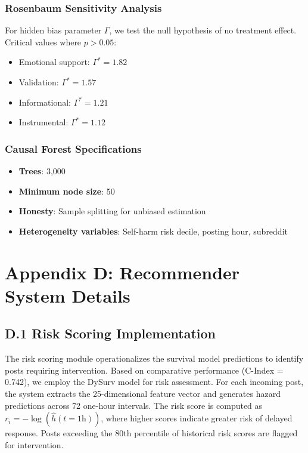 \documentclass[letterpaper]{article} %
\begin{document}
\subsubsection{Rosenbaum Sensitivity Analysis}
For hidden bias parameter $\Gamma$, we test the null hypothesis of no treatment effect. Critical values where $p > 0.05$:
\begin{itemize}
\item Emotional support: $\Gamma^* = 1.82$
\item Validation: $\Gamma^* = 1.57$
\item Informational: $\Gamma^* = 1.21$
\item Instrumental: $\Gamma^* = 1.12$
\end{itemize}

\subsubsection{Causal Forest Specifications}
\begin{itemize}
\item \textbf{Trees}: 3,000
\item \textbf{Minimum node size}: 50
\item \textbf{Honesty}: Sample splitting for unbiased estimation
\item \textbf{Heterogeneity variables}: Self-harm risk decile, posting hour, subreddit
\end{itemize}



\section{Appendix D: Recommender System Details}

\subsection{D.1 Risk Scoring Implementation}

The risk scoring module operationalizes the survival model predictions to identify posts requiring intervention. Based on comparative performance (C-Index = 0.742), we employ the DySurv model for risk assessment. For each incoming post, the system extracts the 25-dimensional feature vector and generates hazard predictions across 72 one-hour intervals. The risk score is computed as $r_i = -\log(\hat{h}(t=1\text{h}))$, where higher scores indicate greater risk of delayed response. Posts exceeding the 80th percentile of historical risk scores are flagged for intervention.
\end{document}
